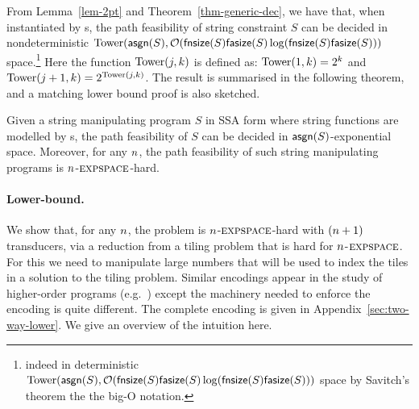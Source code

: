 From Lemma~\ref{lem-2pt} and Theorem~\ref{thm-generic-dec}, %
we have that, when instantiated by \PPT{}s, %
the path feasibility of string constraint $S$ can be decided in 
nondeterministic $\mathrm{Tower}(\mathsf{asgn}(S), \mathcal{O}(\mathsf{fnsize}(S) \mathsf{fasize}(S) \log(\mathsf{fnsize}(S) \mathsf{fasize}(S)))$ space.\footnote{indeed in deterministic $\mathrm{Tower}(\mathsf{asgn}(S), \mathcal{O}(\mathsf{fnsize}(S) \mathsf{fasize}(S) \log(\mathsf{fnsize}(S) \mathsf{fasize}(S)))$ space by Savitch's theorem \cite{Savitch70} the the big-O notation.} Here the function $\mathrm{Tower}(j, k)$ is %
defined as: $\mathrm{Tower}(1, k)= 2^k$ and $\mathrm{Tower}(j+1, k) = 2^{\mathrm{Tower}(j, k)}$. 
The result is summarised in the following theorem, and a matching lower bound proof is also sketched.
%
\begin{theorem} \label{thm:two-way}
Given a string manipulating program $S$ in SSA form where string functions are modelled by \PPT{}s, the path feasibility of $S$ can be decided in $\mathsf{asgn}(S)$-exponential space. Moreover,  for any $n$, the path feasibility of such string manipulating programs is  %
 $n$-$\textsc{expspace}$-hard.
\end{theorem}

\paragraph{Lower-bound.}

We show that, for any $n$, the problem is $n$-$\textsc{expspace}$-hard with $(n+1)$ transducers, via a reduction from a tiling problem that is hard for $n$-$\textsc{expspace}$.
For this we need to manipulate large numbers that will be used to index the tiles in a solution to the tiling problem.
Similar encodings appear in the study of higher-order programs (e.g.~\cite{J01,CW07}) except the machinery needed to enforce the encoding is quite different.
The complete encoding is given in 
          {Appendix~\ref{sec:two-way-lower}}.
We give an overview of the intuition here.

